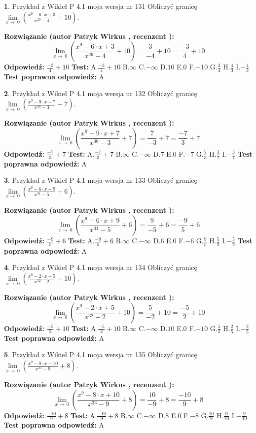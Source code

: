 \documentclass[12pt, a4paper]{article}
\theoremstyle{definition} %
\newtheorem{zad}{}
\newcommand{\zadStart}[1]{\begin{zad}#1\newline}
\newcommand{\zadStop}{\end{zad}}
\newcommand{\rozwStart}[2]{\noindent \textbf{Rozwiązanie (autor #1 , recenzent #2): }\newline}
\newcommand{\rozwStop}{\newline}
\newcommand{\odpStart}{\noindent \textbf{Odpowiedź:}\newline}
\newcommand{\odpStop}{\newline}
\newcommand{\testStart}{\noindent \textbf{Test:}\newline}
\newcommand{\testStop}{\newline}
\newcommand{\kluczStart}{\noindent \textbf{Test poprawna odpowiedź:}\newline}
\newcommand{\kluczStop}{\newline}
\begin{document}
\zadStart{Przykład z Wikieł P 4.1 moja wersja nr 131}
Obliczyć granicę $\lim\limits_{x\to\ 0}(\frac{x^{9}-6 \cdot x +3}{x^{29}-4}+10)$.
\zadStop
\rozwStart{Patryk Wirkus}{}
$$\lim\limits_{x\to\ 0}(\frac{x^{9}-6 \cdot x +3}{x^{29}-4}+10)=\frac{3}{-4}+10=\frac{-3}{4}+10$$
\rozwStop
\odpStart
$\frac{-3}{4}+10$
\odpStop
\testStart
A.$\frac{-3}{4}+10$
B.$\infty$
C.$-\infty$
D.$10$
E.$0$
F.$-10$
G.$\frac{3}{4}$
H.$\frac{4}{3}$
I.$-\frac{4}{3}$
\testStop
\kluczStart
A
\kluczStop



\zadStart{Przykład z Wikieł P 4.1 moja wersja nr 132}
Obliczyć granicę $\lim\limits_{x\to\ 0}(\frac{x^{9}-9 \cdot x +7}{x^{30}-3}+7)$.
\zadStop
\rozwStart{Patryk Wirkus}{}
$$\lim\limits_{x\to\ 0}(\frac{x^{9}-9 \cdot x +7}{x^{30}-3}+7)=\frac{7}{-3}+7=\frac{-7}{3}+7$$
\rozwStop
\odpStart
$\frac{-7}{3}+7$
\odpStop
\testStart
A.$\frac{-7}{3}+7$
B.$\infty$
C.$-\infty$
D.$7$
E.$0$
F.$-7$
G.$\frac{7}{3}$
H.$\frac{3}{7}$
I.$-\frac{3}{7}$
\testStop
\kluczStart
A
\kluczStop



\zadStart{Przykład z Wikieł P 4.1 moja wersja nr 133}
Obliczyć granicę $\lim\limits_{x\to\ 0}(\frac{x^{9}-6 \cdot x +9}{x^{31}-5}+6)$.
\zadStop
\rozwStart{Patryk Wirkus}{}
$$\lim\limits_{x\to\ 0}(\frac{x^{9}-6 \cdot x +9}{x^{31}-5}+6)=\frac{9}{-5}+6=\frac{-9}{5}+6$$
\rozwStop
\odpStart
$\frac{-9}{5}+6$
\odpStop
\testStart
A.$\frac{-9}{5}+6$
B.$\infty$
C.$-\infty$
D.$6$
E.$0$
F.$-6$
G.$\frac{9}{5}$
H.$\frac{5}{9}$
I.$-\frac{5}{9}$
\testStop
\kluczStart
A
\kluczStop



\zadStart{Przykład z Wikieł P 4.1 moja wersja nr 134}
Obliczyć granicę $\lim\limits_{x\to\ 0}(\frac{x^{9}-2 \cdot x +5}{x^{32}-2}+10)$.
\zadStop
\rozwStart{Patryk Wirkus}{}
$$\lim\limits_{x\to\ 0}(\frac{x^{9}-2 \cdot x +5}{x^{32}-2}+10)=\frac{5}{-2}+10=\frac{-5}{2}+10$$
\rozwStop
\odpStart
$\frac{-5}{2}+10$
\odpStop
\testStart
A.$\frac{-5}{2}+10$
B.$\infty$
C.$-\infty$
D.$10$
E.$0$
F.$-10$
G.$\frac{5}{2}$
H.$\frac{2}{5}$
I.$-\frac{2}{5}$
\testStop
\kluczStart
A
\kluczStop



\zadStart{Przykład z Wikieł P 4.1 moja wersja nr 135}
Obliczyć granicę $\lim\limits_{x\to\ 0}(\frac{x^{9}-8 \cdot x +10}{x^{33}-9}+8)$.
\zadStop
\rozwStart{Patryk Wirkus}{}
$$\lim\limits_{x\to\ 0}(\frac{x^{9}-8 \cdot x +10}{x^{33}-9}+8)=\frac{10}{-9}+8=\frac{-10}{9}+8$$
\rozwStop
\odpStart
$\frac{-10}{9}+8$
\odpStop
\testStart
A.$\frac{-10}{9}+8$
B.$\infty$
C.$-\infty$
D.$8$
E.$0$
F.$-8$
G.$\frac{10}{9}$
H.$\frac{9}{10}$
I.$-\frac{9}{10}$
\testStop
\kluczStart
A
\kluczStop
\end{document}
